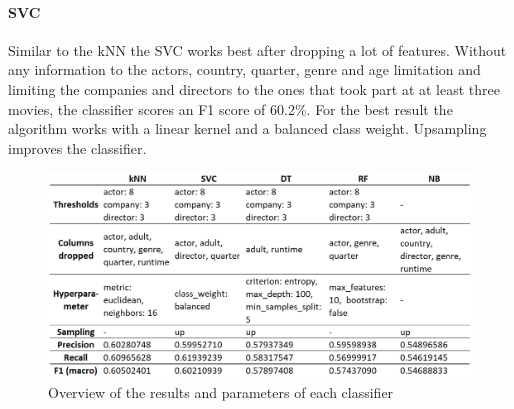 \paragraph{SVC}
Similar to the kNN the SVC works best after dropping a lot of features. Without any information to the actors, country, quarter, genre and age limitation and limiting the companies and directors to the ones that took part at at least three movies, the classifier scores an F1 score of 60.2\%. For the best result the algorithm works with a linear kernel and a balanced class weight. Upsampling improves the classifier.
\begin{figure}[h]
\includegraphics[width=\textwidth]{images/Classifier.png}
	\caption[Overview of the results and parameters of each classifier]{Overview of the results and parameters of each classifier\footnotemark}
\label{img:classifiers}
\end{figure}
\FloatBarrier
{}


